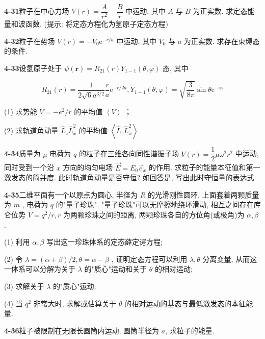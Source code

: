 \newpage

\textbf{4-31}\quad 粒子在中心力场 $\displaystyle V(r) = \dfrac{A}{r^2} -\dfrac{B}{r}$ 中运动, 其中 $\displaystyle A$ 与 $\displaystyle B$ 为正实数. 求定态能量和波函数. (提示: 将定态方程化为氢原子定态方程)

\vfill

\newpage

\textbf{4-32}\quad 粒子在势场 $\displaystyle V(r) = -V_0\mathrm{e}^{-r / a}$ 中运动, 其中 $\displaystyle V_{0}$ 与 $\displaystyle a$ 为正实数. 求存在束缚态的条件.

\vfill

\newpage

\textbf{4-33}\quad 设氢原子处于 $\displaystyle \psi(\boldsymbol{r}) = R_{21}(r) Y_{1-1}(\theta, \varphi)$ 态, 其中

$$
R _ {2 1} (r) = \dfrac {1}{2 \sqrt {6} a ^ {3 / 2}} \dfrac {r}{a} \mathrm{e} ^ {- r / 2 a}, Y _ {1 - 1} (\theta , \varphi) = \sqrt {\dfrac {3}{8 \pi}} \sin \theta \mathrm{e} ^ {- \mathrm{i} \varphi}
$$

(1) 求势能 $\displaystyle V = -e^{2} / r$ 的平均值 $\displaystyle \left\langle V\right\rangle$ ；

(2) 求轨道角动量 $\displaystyle \hat{L}_z \hat{L}_x^2$ 的平均值 $\displaystyle \left\langle \hat{L}_z \hat{L}_x^2 \right\rangle$

\vfill

\newpage

\textbf{4-34}\quad 质量为 $\displaystyle \mu$ 电荷为 $\displaystyle q$ 的粒子在三维各向同性谐振子场 $\displaystyle V(r) = \dfrac{1}{2}\mu \omega^2 r^2$ 中运动, 同时受到一个沿 $\displaystyle x$ 方向的均匀电场 $\displaystyle \vec{E} = E_0\vec{e}_x$ 的作用. 求粒子的能量本征值和第一激发态的简并度. 此时轨道角动量是否守恒? 如回答是, 写出此时守恒量的表达式.

\vfill

\newpage

\textbf{4-35}\quad 二维平面有一个以原点为圆心, 半径为 $\displaystyle R$ 的光滑刚性圆环, 上面套着两颗质量为 $\displaystyle m$ , 电荷为 $\displaystyle q$ 的"量子珍珠". "量子珍珠"可以无摩擦地绕环滑动, 相互之间存在库仑位势 $\displaystyle V = q^2 / r, r$ 为两颗珍珠之间的距离, 两颗珍珠各自的方位角(或极角)为 $\displaystyle \alpha, \beta$ .

(1) 利用 $\displaystyle \alpha, \beta$ 写出这一珍珠体系的定态薛定谔方程;

(2) 令 $\displaystyle \lambda = (\alpha + \beta) / 2, \theta = \alpha - \beta$ , 证明定态方程可以利用 $\displaystyle \lambda, \theta$ 分离变量, 从而这一体系可以分解为关于 $\displaystyle \lambda$ 的"质心"运动和关于 $\displaystyle \theta$ 的相对运动;

(3) 求解关于 $\displaystyle \lambda$ 的"质心"运动;

(4) 当 $\displaystyle q^2$ 非常大时, 求解或估算关于 $\displaystyle \theta$ 的相对运动的基态与最低激发态的本征能量.

\vfill

\newpage

\textbf{4-36}\quad 粒子被限制在无限长圆筒内运动, 圆筒半径为 $\displaystyle a$, 求粒子的能量.

\vfill

\newpage

